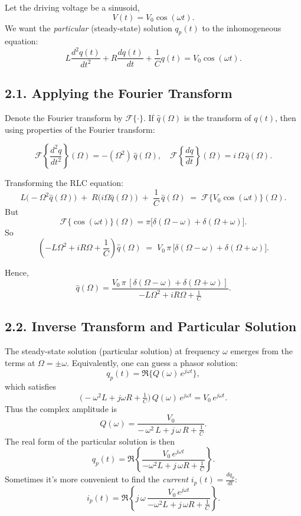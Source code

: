 \documentclass[12pt]{article}
\begin{document}
\noindent Let the driving voltage be a sinusoid,
\[
V(t) = V_0 \cos(\omega t).
\]
We want the \textit{particular} (steady-state) solution $q_p(t)$ to the inhomogeneous equation:
\[
L \frac{d^2 q(t)}{dt^2} + R \frac{d q(t)}{dt} + \frac{1}{C} q(t) = V_0 \cos(\omega t).
\]

\subsection*{2.1. Applying the Fourier Transform}

\noindent Denote the Fourier transform by $\mathcal{F}\{ \cdot \}$. If $\hat{q}(\Omega)$ is the transform of $q(t)$, then using properties of the Fourier transform:

\[
\mathcal{F}\left\{ \frac{d^2 q}{dt^2} \right\}(\Omega) = -( \Omega^2 ) \,\hat{q}(\Omega), 
\quad
\mathcal{F}\left\{ \frac{d q}{dt} \right\}(\Omega) = i\,\Omega \,\hat{q}(\Omega).
\]

\noindent Transforming the RLC equation:
\[
L\bigl(-\Omega^2 \hat{q}(\Omega)\bigr) \;+\; R \bigl(i\Omega \hat{q}(\Omega)\bigr) \;+\; \frac{1}{C} \,\hat{q}(\Omega) 
\;=\; \mathcal{F}\{V_0 \cos(\omega t)\}(\Omega).
\]
But 
\[
\mathcal{F}\{\cos(\omega t)\}(\Omega) = \pi \bigl[\delta(\Omega - \omega) + \delta(\Omega + \omega)\bigr].
\]
So
\[
\left(-L \Omega^2 + iR\Omega + \frac{1}{C}\right)\hat{q}(\Omega) 
\;=\; V_0\,\pi \,\bigl[\delta(\Omega - \omega) + \delta(\Omega + \omega)\bigr].
\]

\noindent Hence,
\[
\hat{q}(\Omega) = \frac{V_0\,\pi\,[\delta(\Omega - \omega) + \delta(\Omega + \omega)]}{-L \Omega^2 + iR\Omega + \tfrac{1}{C}}.
\]

\subsection*{2.2. Inverse Transform and Particular Solution}

\noindent The steady-state solution (particular solution) at frequency $\omega$ emerges from the terms at $\Omega = \pm \omega$. Equivalently, one can guess a phasor solution:
\[
q_p(t) = \Re\Big\{ Q(\omega)\, e^{j \omega t} \Big\}, 
\]
which satisfies
\[
\bigl(-\omega^2 L + j\omega R + \tfrac{1}{C}\bigr)\,Q(\omega)\,e^{j\omega t} = V_0\,e^{j\omega t}.
\]
Thus the complex amplitude is
\[
Q(\omega) = \frac{V_0}{-\,\omega^2\,L + j\,\omega\,R + \tfrac{1}{C}}.
\]
The real form of the particular solution is then
\[
q_p(t) = \Re\left\{ \frac{V_0 \, e^{j\omega t}}{-\omega^2 L + j\,\omega R + \tfrac{1}{C}} \right\}.
\]
Sometimes it's more convenient to find the \textit{current} $i_p(t) = \frac{d q_p}{dt}$:
\[
i_p(t) = \Re\left\{ j\,\omega \,\frac{V_0 \, e^{j\omega t}}{-\omega^2 L + j\,\omega R + \tfrac{1}{C}} \right\}.
\]
\end{document}
